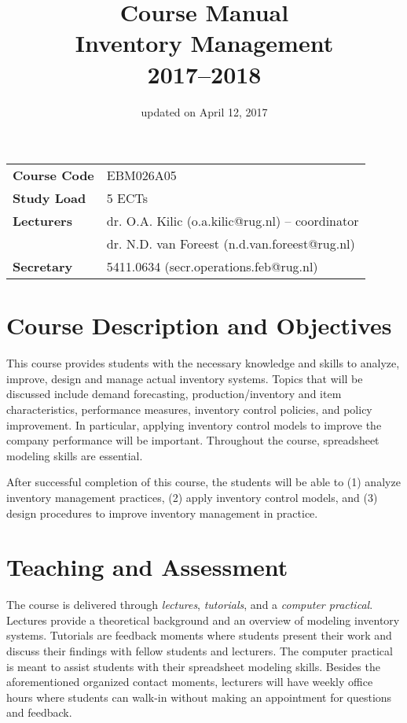 \documentclass{article}
\title{\bf
	Course Manual \\ 
	Inventory Management \\
	{\normalsize 2017--2018}}
\date{\small updated on April 12, 2017}
\author{\empty}
\begin{document}
\maketitle

\begin{table}[htbp]
    \begin{tabular}{ll}
    \textbf{Course Code}  	& EBM026A05 \\
    \textbf{Study Load} 	& 5 ECTs \\
    \textbf{Lecturers} 		& dr. O.A. Kilic (o.a.kilic@rug.nl) -- coordinator \\ 
    		  				& dr. N.D. van Foreest (n.d.van.foreest@rug.nl) \\
    \textbf{Secretary} 		& 5411.0634 (secr.operations.feb@rug.nl) \\
    \end{tabular}%
\end{table}%


{\small\tableofcontents}

\newpage

\section{Course Description and Objectives}

This course provides students with the necessary knowledge and skills to analyze, improve, design and manage actual inventory systems. Topics that will be discussed include demand forecasting, production/inventory and item characteristics, performance measures, inventory control policies, and policy improvement. In particular, applying inventory control models to improve the company performance will be important. Throughout the course, spreadsheet modeling skills are essential.

After successful completion of this course, the students will be able to (1) analyze inventory management practices, (2) apply inventory control models, and (3) design procedures to improve inventory management in practice.


\section{Teaching and Assessment}

The course is delivered through \textit{lectures}, \textit{tutorials}, and a \textit{computer practical}. Lectures provide a theoretical background and an overview of modeling inventory systems. Tutorials are feedback moments where students present their work and discuss their findings with fellow students and lecturers. The computer practical is meant to assist students with their spreadsheet modeling skills. Besides the aforementioned organized contact moments, lecturers will have weekly office hours where students can walk-in without making an appointment for questions and feedback. 
 
\end{document}
